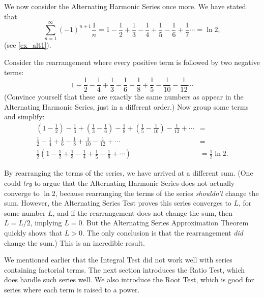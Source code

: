 \clearpage %
We now consider the Alternating Harmonic Series once more. We have stated that 
\[
\sum_{n=1}^\infty (-1)^{n+1}\frac1n
= 1-\frac12+\frac13-\frac14+\frac15-\frac16+\frac17\dotsb = \ln 2,
\]
(see \autoref{ex_alt1}). 

Consider the rearrangement where every positive term is followed by two negative terms:
\[
1-\frac12-\frac14+\frac13-\frac16-\frac18+\frac15-\frac1{10}-\frac1{12}\dotsb
\]
(Convince yourself that these are exactly the same numbers as appear in the Alternating Harmonic Series, just in a different order.) Now group some terms and simplify:
\begin{align*}
\left(1-\frac12\right)-\frac14+\left(\frac13-\frac16\right)-\frac18
+\left(\frac15-\frac1{10}\right)-\frac1{12}+\dotsb &= \\
\frac12-\frac14+\frac16-\frac18+\frac1{10}-\frac{1}{12}+\dotsb &= \\
\frac12\left(1-\frac12+\frac13-\frac14+\frac15-\frac16+\dotsb\right) & = \frac12\ln 2.
\end{align*}

By rearranging the terms of the series, we have arrived at a different sum. (One could \emph{try} to argue that the Alternating Harmonic Series does not actually converge to $\ln 2$, because rearranging the terms of the series \emph{shouldn't} change the sum. However, the Alternating Series Test proves this series converges to $L$, for some number $L$, and if the rearrangement does not change the sum, then $L = L/2$, implying $L=0$. But the Alternating Series Approximation Theorem quickly shows that $L>0$. The only conclusion is that the rearrangement \emph{did} change the sum.) This is an incredible result.\bigskip


We mentioned earlier that the Integral Test did not work well with series containing factorial terms. The next section introduces the Ratio Test, which does handle such series well. We also introduce the Root Test, which is good for series where each term is raised to a power.

